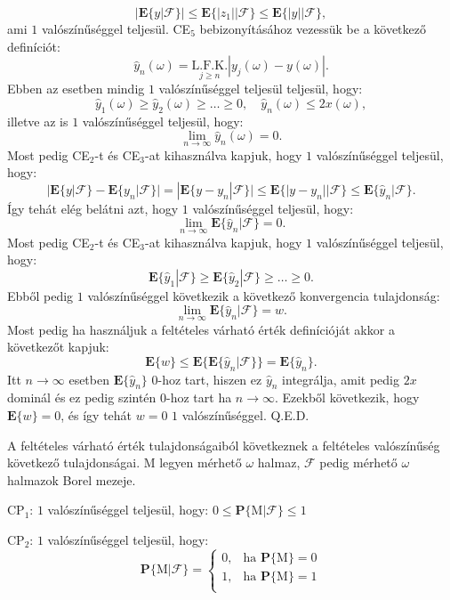 \documentclass{article}
\begin{document}
\[
 |\mathrm{\textbf{E}}\{y | \mathscr{F} \}| \leq \mathrm{\textbf{E}}\{|z_1| | \mathscr{F} \} \leq \mathrm{\textbf{E}}\{|y| | \mathscr{F} \},
\]
ami $1$ valószínűséggel teljesül. CE$_5$ bebizonyításához vezessük be a következő definíciót: 
\[
	\hat{y}_{n}(\omega) = \underset{j \geq n}{\mathrm{L.F.K.}} |y_j(\omega) - y(\omega)|.
\]
Ebben az esetben mindig $1$ valószínűséggel teljesül teljesül, hogy:
\[
 \hat{y}_{1}(\omega) \geq \hat{y}_{2}(\omega) \geq \ldots \geq 0, \quad \hat{y}_{n}(\omega) \leq 2 x(\omega),
\]
illetve az is $1$ valószínűséggel teljesül, hogy: 
\[
 \lim_{n \to \infty} \hat{y}_{n}(\omega) = 0.
\]
Most pedig CE$_2$-t és CE$_3$-at kihasználva kapjuk, hogy $1$ valószínűséggel teljesül, hogy:
\[
 |\mathrm{\textbf{E}}\{y | \mathscr{F} \} - \mathrm{\textbf{E}}\{y_n | \mathscr{F} \} | = |\mathrm{\textbf{E}}\{y - y_n| \mathscr{F} \}| \leq \mathrm{\textbf{E}}\{|y - y_n|| \mathscr{F} \} \leq \mathrm{\textbf{E}}\{\hat{y}_{n} | \mathscr{F} \}.
\]
Így tehát elég belátni azt, hogy $1$ valószínűséggel teljesül, hogy:
\[
 \lim_{n \to \infty} \mathrm{\textbf{E}}\{\hat{y}_{n} | \mathscr{F} \} = 0.
\]
Most pedig CE$_2$-t és CE$_3$-at kihasználva kapjuk, hogy $1$ valószínűséggel teljesül, hogy:
\[
 \mathrm{\textbf{E}}\{\hat{y}_{1} | \mathscr{F} \} \geq \mathrm{\textbf{E}}\{\hat{y}_{2} | \mathscr{F} \} \geq \ldots \geq 0.
\]
Ebből pedig $1$ valószínűséggel következik a következő konvergencia tulajdonság:
\[
 \lim_{n \to \infty} \mathrm{\textbf{E}}\{\hat{y}_{n} | \mathscr{F} \} = w.
\]
Most pedig ha használjuk a feltételes várható érték definícióját akkor a következőt kapjuk:
\[
 \mathrm{\textbf{E}}\{ w \} \leq \mathrm{\textbf{E}}\{ \mathrm{\textbf{E}}\{\hat{y}_{n} | \mathscr{F} \}  \}  = \mathrm{\textbf{E}}\{\hat{y}_{n} \}.
\]
Itt $n \to \infty$ esetben $\mathrm{\textbf{E}}\{\hat{y}_{n} \}$ $0$-hoz tart, hiszen ez $\hat{y}_{n}$ integrálja, amit pedig $2x$ dominál és ez pedig szintén $0$-hoz tart ha $n \to \infty$. Ezekből következik, hogy $\mathrm{\textbf{E}}\{ w \} = 0$, és így tehát $w = 0$ $1$ valószínűséggel. Q.E.D.

A feltételes várható érték tulajdonságaiból következnek a feltételes valószínűség következő tulajdonságai. $\mathrm{M}$ legyen mérhető $\omega$ halmaz, $\mathscr{F}$ pedig mérhető $\omega$ halmazok Borel mezeje.

CP$_1$: $1$ valószínűséggel teljesül, hogy: $0 \leq \mathrm{\textbf{P}} \{\mathrm{M} | \mathscr{F} \}\leq 1$

CP$_2$: $1$ valószínűséggel teljesül, hogy: 
\[
\mathrm{\textbf{P}} \{\mathrm{M} | \mathscr{F} \}  = \begin{cases}
    0, & \text{ha } \mathrm{\textbf{P}} \{\mathrm{M} \}  = 0 \\
    1, & \text{ha } \mathrm{\textbf{P}} \{\mathrm{M} \}  = 1 \\
\end{cases}
\]
\end{document}

